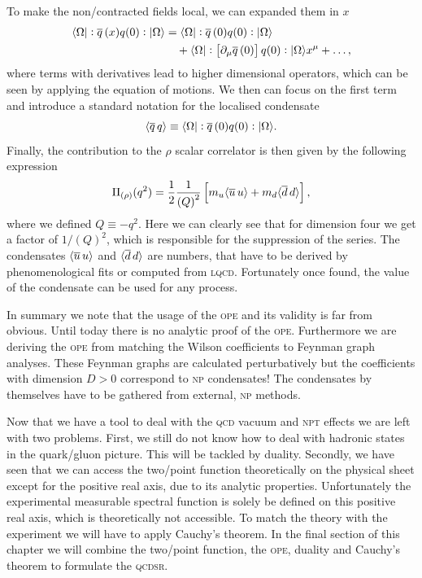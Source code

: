 \documentclass[../../index.tex]{subfiles}
\begin{document}
To make the non\-/contracted fields local, we can expanded them in \(x\)
\begin{equation}
  \begin{split}
    \langle \Omega \vert: \overline{q}\,(x) q(0):\vert \Omega \rangle &= \langle\Omega\vert: \overline{q}\,(0) q(0): \vert\Omega\rangle\\
    &\quad+ \langle\Omega\vert:\left[ \partial_\mu \overline{q}\,(0) \right]
    q(0):\vert\Omega\rangle x^\mu + \dots,
  \end{split}
\end{equation}
where terms with derivatives lead to higher dimensional operators, which can be
seen by applying the equation of motions. We then can focus on the first term
and introduce a standard notation for the localised condensate
\begin{equation}
  \langle \overline{q}\,q \rangle \equiv \langle\Omega\vert: \overline{q}\,(0) q(0):\vert\Omega\rangle.
\end{equation}
Finally, the contribution to the \(\rho\) scalar correlator is then given by the
following expression
\begin{equation}
  \Pi_{(\rho)}(q^2) = \frac{1}{2} \frac{1}{\left(Q\right)^2}
  \left[ m_u\langle \overline{u}\, u \rangle + m_d \langle \overline{d}\, d \rangle\right],
\end{equation}
where we defined \(Q \equiv -q^2\). Here we can clearly see that for dimension four we
get a factor of \(1/(Q)^2\), which is responsible for the suppression of the
series. The condensates \(\langle\overline{u}\,u\rangle\) and
\(\langle\overline{d}\,d\rangle\) are numbers, that have to be derived by
phenomenological fits or computed from \textsc{lqcd}. Fortunately once found,
the value of the condensate can be used for any process.

In summary we note that the usage of the \textsc{ope} and its validity is far
from obvious. Until today there is no analytic proof of the \textsc{ope}.
Furthermore we are deriving the \textsc{ope} from matching the Wilson
coefficients to Feynman graph analyses. These Feynman graphs are calculated
perturbatively but the coefficients with dimension \(D>0\) correspond to
\textsc{np} condensates! The condensates by themselves have to be gathered from
external, \textsc{np} methods.

Now that we have a tool to deal with the \textsc{qcd} vacuum and \textsc{npt}
effects we are left with two problems. First, we still do not know how to deal
with hadronic states in the quark\-/gluon picture. This will be tackled by
duality. Secondly, we have seen that we can access the two\-/point function
theoretically on the physical sheet except for the positive real axis, due to
its analytic properties. Unfortunately the experimental measurable spectral
function is solely be defined on this positive real axis, which is theoretically
not accessible. To match the theory with the experiment we will have to apply
Cauchy's theorem. In the final section of this chapter we will combine
the two\-/point function, the \textsc{ope}, duality and Cauchy's theorem to
formulate the \textsc{qcdsr}.
\end{document}

